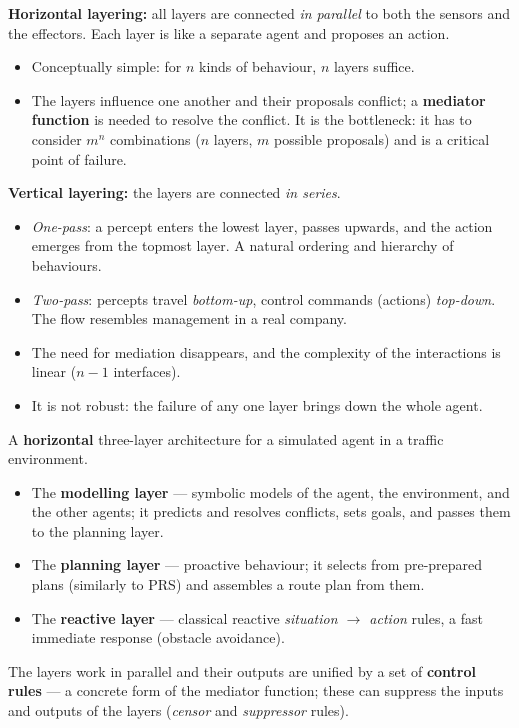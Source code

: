 \documentclass[11pt,a4paper]{article}
\theoremstyle{definition}
\begin{document}
\begin{defbox}
\textbf{Horizontal layering:} all layers are connected \emph{in parallel} to both the sensors and
the effectors. Each layer is like a separate agent and proposes an action.
\begin{itemize}
\item[$+$] Conceptually simple: for $n$ kinds of behaviour, $n$ layers suffice.
\item[$-$] The layers influence one another and their proposals conflict; a \textbf{mediator
  function} is needed to resolve the conflict. It is the bottleneck: it has to consider $m^n$
  combinations ($n$ layers, $m$ possible proposals) and is a critical point of failure.
\end{itemize}

\textbf{Vertical layering:} the layers are connected \emph{in series}.
\begin{itemize}
\item \emph{One-pass}: a percept enters the lowest layer, passes upwards, and the action emerges from
  the topmost layer. A natural ordering and hierarchy of behaviours.
\item \emph{Two-pass}: percepts travel \emph{bottom-up}, control commands (actions)
  \emph{top-down}. The flow resembles management in a real company.
\item[$+$] The need for mediation disappears, and the complexity of the interactions is linear
  ($n-1$ interfaces).
\item[$-$] It is not robust: the failure of any one layer brings down the whole agent.
\end{itemize}
\end{defbox}

\begin{defbox}
A \textbf{horizontal} three-layer architecture for a simulated agent in a traffic environment.
\begin{itemize}
\item The \textbf{modelling layer} --- symbolic models of the agent, the environment, and the other
  agents; it predicts and resolves conflicts, sets goals, and passes them to the planning layer.
\item The \textbf{planning layer} --- proactive behaviour; it selects from pre-prepared plans
  (similarly to PRS) and assembles a route plan from them.
\item The \textbf{reactive layer} --- classical reactive \emph{situation $\to$ action} rules, a fast
  immediate response (obstacle avoidance).
\end{itemize}
The layers work in parallel and their outputs are unified by a set of \textbf{control rules} --- a
concrete form of the mediator function; these can suppress the inputs and outputs of the layers
(\emph{censor} and \emph{suppressor} rules).
\end{defbox}
\end{document}
